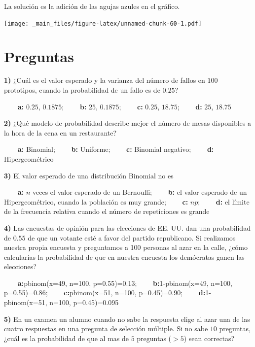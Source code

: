 \documentclass[
]{book}
\begin{document}
La solución es la adición de las agujas azules en el gráfico.

\texttt{[image: \_main\_files/figure-latex/unnamed-chunk-60-1.pdf]}

\hypertarget{preguntas-4}{%
\section{Preguntas}\label{preguntas-4}}

\textbf{1)} ¿Cuál es el valor esperado y la varianza del número de fallos en \(100\) prototipos, cuando la probabilidad de un fallo es de \(0.25\)?

\textbf{\(\qquad\)a:} \(0.25\), \(0.1875\);
\textbf{\(\qquad\)b:} \(25\), \(0.1875\);
\textbf{\(\qquad\)c:} \(0.25\), \(18.75\);
\textbf{\(\qquad\)d:} \(25\), \(18.75\)

\textbf{2)} ¿Qué modelo de probabilidad describe mejor el número de mesas disponibles a la hora de la cena en un restaurante?

\textbf{\(\qquad\)a:} Binomial;
\textbf{\(\qquad\)b:} Uniforme;
\textbf{\(\qquad\)c:} Binomial negativo;
\textbf{\(\qquad\)d:} Hipergeométrico

\textbf{3)} El valor esperado de una distribución Binomial no es

\textbf{\(\qquad\)a:} \(n\) veces el valor esperado de un Bernoulli;
\textbf{\(\qquad\)b:} el valor esperado de un Hipergeométrico, cuando la población es muy grande;
\textbf{\(\qquad\)c:} \(np\);
\textbf{\(\qquad\)d:} el límite de la frecuencia relativa cuando el número de repeticiones es grande

\textbf{4)} Las encuestas de opinión para las elecciones de EE. UU. dan una probabilidad de \(0.55\) de que un votante esté a favor del partido republicano. Si realizamos nuestra propia encuesta y preguntamos a 100 personas al azar en la calle, ¿cómo calcularías la probabilidad de que en nuestra encuesta los demócratas ganen las elecciones?

\textbf{\(\qquad\)a:}pbinom(x=49, n=100, p=0.55)=0.13;
\textbf{\(\qquad\)b:}1-pbinom(x=49, n=100, p=0.55)=0.86;
\textbf{\(\qquad\)c:}pbinom(x=51, n=100, p=0.45)=0.90; \textbf{\(\qquad\)d:}1-pbinom(x=51, n=100, p=0.45)=0.095

\textbf{5)} En un examen un alumno cuando no sabe la respuesta elige al azar una de las cuatro respuestas en una pregunta de selección múltiple. Si no sabe \(10\) preguntas, ¿cuál es la probabilidad de que al mas de \(5\) preguntas (\(>5\)) sean correctas?
\end{document}
